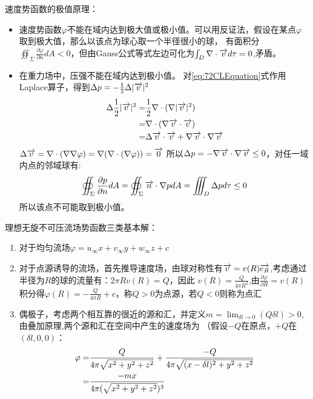 速度势函数的极值原理：
\begin{itemize}
\item 速度势函数$\varphi$不能在域内达到极大值或极小值。可以用反证法，假设在某点$\varphi$取到极大值，那么以该点为球心取一个半径很小的球，
有面积分$\oiint_{\Sigma} \frac{\partial \varphi}{\partial n}dA<0$，但由Gauss公式等式左边可化为$\int_{D} \nabla\cdot \overrightarrow{v}d\tau=0$,矛盾。
\item 在重力场中，压强不能在域内达到极小值。
对\eqref{eq:72CLEquation}式作用Laplace算子，得到$\Delta p=-\frac{1}{2} \Delta |\overrightarrow{v}|^2$
\begin{align*}
\Delta \frac{1}{2}|\overrightarrow{v}|^2=&\frac{1}{2}\nabla\cdot(\nabla |\overrightarrow{v}|^2)\\
=&\nabla\cdot(\nabla\overrightarrow{v}\cdot\overrightarrow{v})\\
=&\Delta \overrightarrow{v}\cdot\overrightarrow{v}+\nabla\overrightarrow{v}\cdot\nabla\overrightarrow{v}
\end{align*}
$\Delta \overrightarrow{v}=\nabla\cdot(\nabla \nabla \varphi)=\nabla (\nabla\cdot(\nabla \varphi))=\overrightarrow{0}$
所以$\Delta p=-\nabla\overrightarrow{v}\cdot\nabla\overrightarrow{v}\leq 0$，对任一域内点的邻域球有:
\begin{equation}
\oiint_{\Sigma}\frac{\partial p}{\partial n} dA=\oiint_{\Sigma}\overrightarrow{n}\cdot\nabla p dA=\iiint_{D} \Delta p d\tau \leq 0
\end{equation}
所以该点不可能取到极小值。
\end{itemize}


理想无旋不可压流场势函数三类基本解：
\begin{enumerate}
\item 对于均匀流场$\varphi=u_{\infty}x+v_{\infty}y+w_{\infty}z+c$
\item 对于点源诱导的流场，首先推导速度场，由球对称性有$\overrightarrow{v}=v(R)\overrightarrow{e_R}$,考虑通过半径为$R$的球的流量有：$2\pi R v(R)=Q$，因此
$v(R)=\frac{Q}{4\pi R^2}$,由$\frac{\partial \varphi}{\partial R}=v(R)$积分得$\varphi(R)=-\frac{Q}{4\pi R}+c$，称$Q>0$为点源，若$Q<0$则称为点汇
\item 偶极子，考虑两个相互靠的很近的源和汇，并定义$m=\displaystyle\lim_{\delta l \to 0}(Q\delta l)>0$,由叠加原理,两个源和汇在空间中产生的速度场为
（假设$-Q$在原点，$+Q$在$(\delta l,0,0)$：
\begin{align}\notag
\varphi=&\frac{Q}{4\pi \sqrt{x^2+y^2+z^2}}+\frac{-Q}{4\pi \sqrt{(x-\delta l)^2+y^2+z^2}}\\
=&\frac{-mx}{4\pi(\sqrt{x^2+y^2+z^2})^3}\label{eq:81Pole3}
\end{align}
\end{enumerate}

